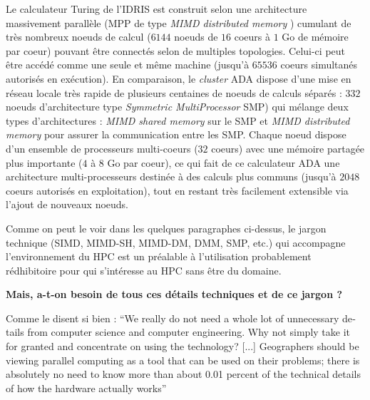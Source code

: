 Le calculateur Turing de l'IDRIS est construit selon une architecture massivement parallèle (MPP de type \textit{MIMD distributed memory} \autocite{Snir2011}) cumulant de très nombreux noeuds de calcul ($\num{6144}$ noeuds de $16$ coeurs à $1$ Go de mémoire par coeur) pouvant être connectés selon de multiples topologies. Celui-ci peut être accédé comme une seule et même machine (jusqu'à $\num{65536}$ coeurs simultanés autorisés en exécution). En comparaison, le \textit{cluster} ADA dispose d'une mise en réseau locale très rapide de plusieurs centaines de noeuds de calculs séparés : $332$ noeuds d'architecture type \textit{Symmetric MultiProcessor} SMP) qui mélange deux types d'architectures : \textit{MIMD shared memory} sur le SMP et \textit{MIMD distributed memory} pour assurer la communication entre les SMP. Chaque noeud dispose d'un ensemble de processeurs multi-coeurs ($32$ coeurs) avec une mémoire partagée plus importante ($4$ à $8$ Go par coeur), ce qui fait de ce calculateur ADA une architecture multi-processeurs destinée à des calculs plus communs (jusqu'à $\num{2048}$ coeurs autorisés en exploitation), tout en restant très facilement extensible via l'ajout de nouveaux noeuds.

Comme on peut le voir dans les quelques paragraphes ci-dessus, le jargon technique (SIMD, MIMD-SH, MIMD-DM, DMM, SMP, etc.) qui accompagne l'environnement du HPC est un préalable à l'utilisation probablement rédhibitoire pour qui s'intéresse au HPC sans être du domaine.

\textbf{Mais, a-t-on besoin de tous ces détails techniques et de ce jargon ?}

Comme le disent si bien \textcite{Openshaw2000} : \foreignquote{english}{We really do not need a whole lot of unnecessary details from computer science and computer engineering. Why not simply take it for granted and concentrate on using the technology? [...] Geographers should be viewing parallel computing as a tool that can be used on their problems; there is absolutely no need to know more than about 0.01 percent of the technical details of how the hardware actually works}

